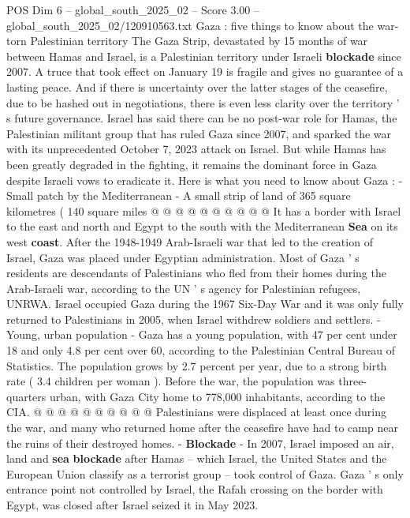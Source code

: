 \begin{textsample}{POS Dim 6 – global\_south\_2025\_02 – Score 3.00 – global\_south\_2025\_02/120910563.txt}  \label{ex:f6_pos_416}
Gaza : five things to know about the war-torn Palestinian territory The Gaza Strip, devastated by 15 months of war between Hamas and Israel, is a Palestinian territory under Israeli \textbf{blockade} since 2007.
A truce that took effect on January 19 is fragile and gives no guarantee of a lasting peace.
And if there is uncertainty over the latter stages of the ceasefire, due to be hashed out in negotiations, there is even less clarity over the territory ' s future governance.
Israel has said there can be no post-war role for Hamas, the Palestinian militant group that has ruled Gaza since 2007, and sparked the war with its unprecedented October 7, 2023 attack on Israel.
But while Hamas has been greatly degraded in the fighting, it remains the dominant force in Gaza despite Israeli vows to eradicate it.
Here is what you need to know about Gaza : - Small patch by the Mediterranean - A small strip of land of 365 square kilometres ( 140 square miles @ @ @ @ @ @ @ @ @ @ It has a border with Israel to the east and north and Egypt to the south with the Mediterranean \textbf{Sea} on its west \textbf{coast}.
After the 1948-1949 Arab-Israeli war that led to the creation of Israel, Gaza was placed under Egyptian administration.
Most of Gaza ' s residents are descendants of Palestinians who fled from their homes during the Arab-Israeli war, according to the UN ' s agency for Palestinian refugees, UNRWA.
Israel occupied Gaza during the 1967 Six-Day War and it was only fully returned to Palestinians in 2005, when Israel withdrew soldiers and settlers. - Young, urban population - Gaza has a young population, with 47 per cent under 18 and only 4.8 per cent over 60, according to the Palestinian Central Bureau of Statistics.
The population grows by 2.7 percent per year, due to a strong birth rate ( 3.4 children per woman ).
Before the war, the population was three-quarters urban, with Gaza City home to 778,000 inhabitants, according to the CIA. @ @ @ @ @ @ @ @ @ @ Palestinians were displaced at least once during the war, and many who returned home after the ceasefire have had to camp near the ruins of their destroyed homes. - \textbf{Blockade} - In 2007, Israel imposed an air, land and \textbf{sea} \textbf{blockade} after Hamas -- which Israel, the United States and the European Union classify as a terrorist group -- took control of Gaza.
Gaza ' s only entrance point not controlled by Israel, the Rafah crossing on the border with Egypt, was closed after Israel seized it in May 2023.

\end{textsample}
